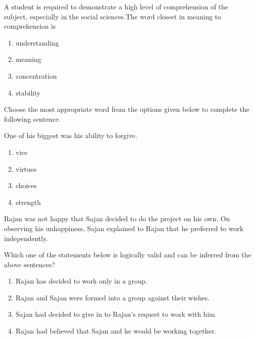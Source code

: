 \iffalse
  \title{Assignment1 EE24BTECH11025}
  \author{GEEDI HARSHA VARDHAN}
  \section{ph}
  \chapter{2014}
\fi

\item
A student is required to demonstrate a high level of comprehension of the subject, especially in the social sciences.The word closest in meaning to comprehension is

\begin{enumerate}
\item  understanding
\item  meaning
\item  concentration
\item  stability
\end{enumerate}

\item 
Choose the most appropriate word from the options given below to complete the following sentence.

One of his biggest was his ability to forgive.

\begin{enumerate}
\item  vice
\item  virtues
\item  choices
\item  strength
\end{enumerate}

\item 
Rajan was not happy that Sajan decided to do the project on his own. On observing his unhappiness, Sajan explained to Rajan that he preferred to work independently.

Which one of the statements below is logically valid and can be inferred from the above sentences?

\begin{enumerate}
\item  Rajan has decided to work only in a group.
\item  Rajan and Sajan were formed into a group against their wishes.
\item  Sajan had decided to give in to Rajan's request to work with him.
\item  Rajan had believed that Sajan and he would be working together.
\end{enumerate}

